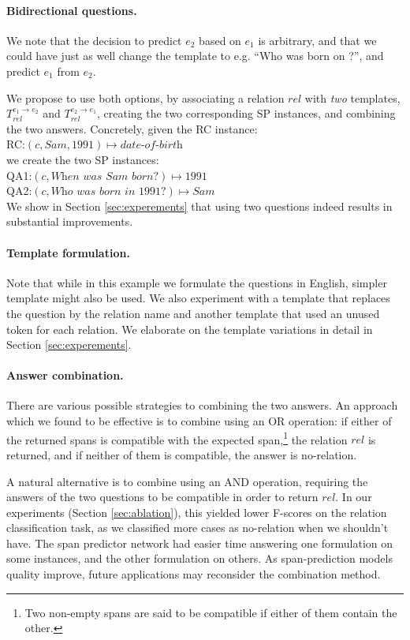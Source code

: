 \documentclass[11pt]{article}
\begin{document}
\paragraph{Bidirectional questions.}
We note that the decision to predict $e_2$ based on $e_1$ is arbitrary, and that we could have just as well change the template to e.g. ``Who was born on \underline{\hspace{1em}}?'', and predict $e_1$ from $e_2$.

We propose to use both options, by associating a relation $rel$ with \emph{two} templates, $T^{e_1\rightarrow e_2}_{rel}$ and $T^{e_2\rightarrow e_1}_{rel}$, creating the two corresponding SP instances, and combining the two answers. Concretely, given the RC instance:\\[0.5em]
\indent RC:$(c, Sam, 1991) \mapsto \textit{date-of-birth}$\\[0.5em] we create the two SP instances:\\[0.5em]
\indent QA1:$(c, \textit{When was Sam born?}) \mapsto \textit{1991}$\\[0.5em]
\indent QA2:$(c, \textit{Who was born in 1991?}) \mapsto \textit{Sam}$\\[0.5em]
We show in Section \ref{sec:experements} that using two questions indeed results in substantial improvements.
\paragraph{Template formulation.}
Note that while in this example we formulate the questions in English, simpler template might also be used. We also experiment with a template that replaces the question by the relation name and another template that used an unused token for each relation. We elaborate on the template variations in detail in Section \ref{sec:experements}.
\paragraph{Answer combination.}
There are various possible strategies to combining the two answers. An approach which we found to be effective is to combine using an OR operation: if either of the returned spans is compatible with the expected span,\footnote{Two non-empty spans are said to be compatible if either of them contain the other.}  the relation $rel$ is returned, and if neither of them is compatible, the answer is no-relation.

A natural alternative is to combine using an AND operation, requiring the answers of the two questions to be compatible in order to return $rel$. In our experiments (Section \ref{sec:ablation}), this yielded lower F-scores on the relation classification task, as we classified more cases as no-relation when we shouldn't have. The span predictor network had easier time answering one formulation on some instances, and the other formulation on others. As span-prediction models quality improve, future applications may reconsider the combination method.
\end{document}
